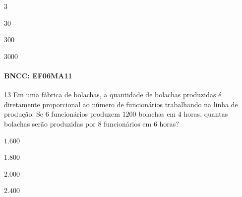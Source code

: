 \begin{escolha}
\item $3$
\item $30$
\item $300$
\item $3000$
\end{escolha}

\paragraph{BNCC: EF06MA11}


\num{13} Em uma fábrica de bolachas, a quantidade de bolachas produzidas é
diretamente proporcional ao número de funcionários trabalhando na linha
de produção. Se $6$ funcionários produzem $1200$ bolachas em $4$ horas,
quantas bolachas serão produzidas por $8$ funcionários em $6$ horas?

\begin{escolha}
\item $1.600$ 
\item $1.800$ 
\item $2.000$ 
\item $2.400$
\end{escolha}


